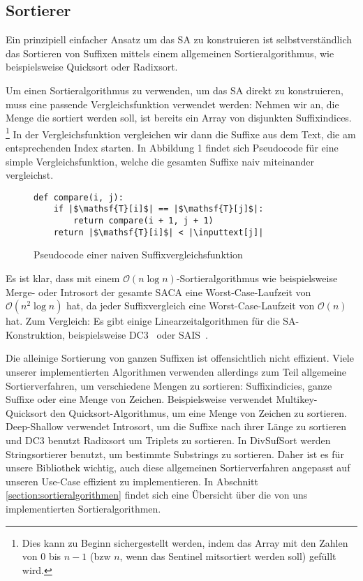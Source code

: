 \subsection{Sortierer}
Ein  prinzipiell einfacher Ansatz um das SA zu konstruieren
ist selbstverständlich das Sortieren von Suffixen mittels einem allgemeinen Sortieralgorithmus,
wie beispielsweise Quicksort oder Radixsort.

Um einen Sortieralgorithmus zu verwenden, um das SA direkt zu konstruieren,
muss eine passende Vergleichsfunktion verwendet werden:
Nehmen wir an, die Menge die sortiert werden soll, ist bereits ein Array von disjunkten Suffixindices.
\footnote{Dies kann zu Beginn sichergestellt werden, indem das
Array mit den Zahlen von 0 bis $n-1$ (bzw $n$, wenn das Sentinel mitsortiert werden soll) gefüllt wird.}
In der Vergleichsfunktion vergleichen wir dann die Suffixe aus dem Text, die am entsprechenden Index starten.
In Abbildung 1 findet sich Pseudocode für eine simple Vergleichsfunktion,
welche die gesamten Suffixe naiv miteinander vergleichst.

\begin{figure}[!h]
\begin{verbatim}
def compare(i, j):
    if |$\mathsf{T}[i]$| == |$\mathsf{T}[j]$|:
        return compare(i + 1, j + 1)
    return |$\mathsf{T}[i]$| < |\inputtext[j]|
\end{verbatim}
\caption{Pseudocode einer naiven Suffixvergleichsfunktion}
\end{figure}
%
Es ist klar, dass mit einem $\mathcal O(n \log n)$-Sortieralgorithmus wie beispielsweise Merge- oder Introsort der gesamte SACA eine Worst-Case-Laufzeit von $\mathcal O(n^2 \log n)$ hat, da jeder Suffixvergleich eine Worst-Case-Laufzeit von $\mathcal O(n)$ hat.
Zum Vergleich: Es gibt einige Linearzeitalgorithmen für die SA-Konstruktion, beispielsweise DC3~\cite{saca:9} oder SAIS~\cite{saca:6}.

Die alleinige Sortierung von ganzen Suffixen ist offensichtlich nicht effizient.
Viele unserer implementierten Algorithmen verwenden allerdings zum Teil allgemeine Sortierverfahren,
um verschiedene Mengen zu sortieren: Suffixindicies, ganze Suffixe oder eine Menge von Zeichen.
Beispielsweise verwendet Multikey-Quicksort den Quicksort-Algorithmus, um eine Menge von Zeichen zu sortieren.
Deep-Shallow verwendet Introsort, um die Suffixe nach ihrer Länge zu sortieren
und DC3 benutzt Radixsort um Triplets zu sortieren.
In DivSufSort werden Stringsortierer benutzt, um bestimmte Substrings zu sortieren.
Daher ist es für unsere Bibliothek wichtig, auch diese allgemeinen Sortierverfahren angepasst
auf unseren Use-Case effizient zu implementieren.
In Abschnitt \ref{section:sortieralgorithmen} findet sich eine Übersicht über die von uns
implementierten Sortieralgorithmen.
